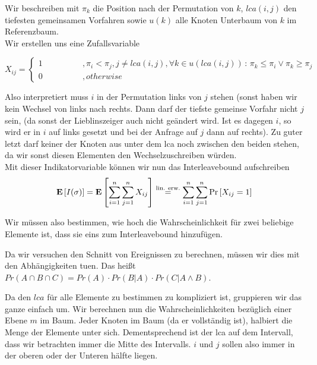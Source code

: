 \documentclass[11pt,a4paper,ngerman]{article}
\newcommand{\erw}[1]{\text{\bfseries E} \left[ #1 \right]}
\newcommand{\prob}[1]{\text{Pr}\left[ #1 \right]}
\begin{document}
Wir beschreiben mit $\pi_k$ die Position nach der Permutation von $k$, $lca(i,j)$ den tiefesten gemeinsamen Vorfahren sowie
$u(k)$ alle Knoten Unterbaum von $k$ im Referenzbaum.\\

Wir erstellen uns eine Zufallsvariable

$$
	X_{ij} = \left\{ \begin{array}{lr}
		1 \qquad \qquad&,  \pi_i < \pi_j , j \not=lca(i,j), \forall k \in u(lca(i,j)) \, : \, \pi_k \leq \pi_i \lor \pi_k \geq \pi_j\\
		0 &, otherwise
	\end{array}
	\right.
$$

Also interpretiert muss $i$ in der Permutation links von $j$ stehen (sonst haben wir kein Wechsel von links nach rechts. Dann darf der tiefste gemeinse Vorfahr nicht $j$ sein, (da sonst der Lieblinszeiger auch nicht geändert wird. Ist es dagegen $i$, so wird er in $i$ auf links gesetzt und bei der
Anfrage auf $j$ dann auf rechts). Zu guter letzt darf keiner der Knoten aus unter dem lca noch zwischen den beiden stehen, da wir sonst diesen
Elementen den Wechselzuschreiben würden.\\

Mit dieser Indikatorvariable können wir nun das Interleavebound aufschreiben
$$
	\erw{I(\sigma)} = \erw{\sum_{i=1}^n \sum_{j=1}^n X_{ij}} \stackrel{\text{lin. erw.}}{=} \sum_{i=1}^n \sum_{j=1}^n \prob{X_{ij}=1}
$$

Wir müssen also bestimmen, wie hoch die Wahrscheinlichkeit für zwei beliebige Elemente ist, dass sie eins zum Interleavebound hinzufügen.

Da wir versuchen den Schnitt von Ereignissen zu berechnen, müssen wir dies mit den Abhängigkeiten tuen.
Das heißt $Pr(A \cap B \cap C) = Pr(A) \cdot Pr(B|A) \cdot Pr(C| A \land B)$.

Da den $lca$ für alle Elemente zu bestimmen zu kompliziert ist, gruppieren wir das ganze einfach um. Wir berechnen nun die Wahrscheinlichkeiten bezüglich einer Ebene $m$ im Baum. Jeder Knoten im Baum (da er vollständig ist), halbiert die Menge der Elemente unter sich. Dementsprechend
ist der lca auf dem Intervall, dass wir betrachten immer die Mitte des Intervalls. $i$ und $j$ sollen also immer in der oberen oder der Unteren hälfte liegen.
\end{document}
